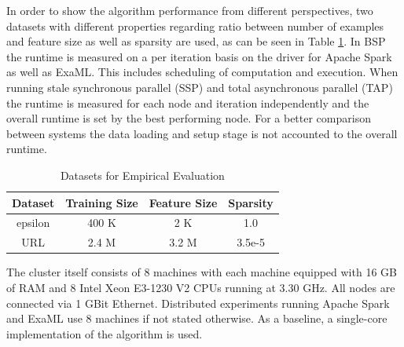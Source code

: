 In order to show the algorithm performance from different perspectives, two datasets with different properties regarding ratio between number of examples and feature size as well as sparsity are used, as can be seen in Table \ref{tab:datasets}.
In BSP the runtime is measured on a per iteration basis on the driver for Apache Spark as well as ExaML.
This includes scheduling of computation and execution.
When running stale synchronous parallel (SSP) and total asynchronous parallel (TAP) the runtime is measured for each node and iteration independently and the overall runtime is set by the best performing node.
For a better comparison between systems the data loading and setup stage is not accounted to the overall runtime.
\begin{table}[h]
\begin{center}
\begin{tabular}{ | c | c | c | c |}
\hline
\textbf{Dataset} & \textbf{Training Size} & \textbf{Feature Size} & \textbf{Sparsity} \\ \hline
epsilon & 400 K & 2 K & 1.0 \\ \hline
URL & 2.4 M & 3.2 M & 3.5e-5 \\
\hline
\end{tabular}
\end{center}
\caption{Datasets for Empirical Evaluation}
\label{tab:datasets}
\end{table}

The cluster itself consists of 8 machines with each machine equipped with 16 GB of RAM and 8 Intel Xeon E3-1230 V2 CPUs running at 3.30 GHz.
All nodes are connected via 1 GBit Ethernet.
Distributed experiments running Apache Spark and ExaML use 8 machines if not stated otherwise.
As a baseline, a single-core implementation of the algorithm is used.

